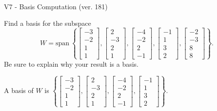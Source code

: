 \begin{exercise}
  \begin{exerciseTitle}V7 - Basis Computation (ver. 181)\end{exerciseTitle}
  \begin{exerciseStatement}
    Find a basis for the subspace 
\[W=\mathrm{span}\ \left\{\left[\begin{array}{r}
-3 \\
-2 \\
1 \\
1
\end{array}\right] , \left[\begin{array}{r}
2 \\
-3 \\
2 \\
1
\end{array}\right] , \left[\begin{array}{r}
-4 \\
-2 \\
2 \\
-1
\end{array}\right] , \left[\begin{array}{r}
-1 \\
1 \\
3 \\
2
\end{array}\right] , \left[\begin{array}{r}
-2 \\
-3 \\
8 \\
8
\end{array}\right]\right\}.\]
 Be sure to explain why your result is a basis.


  \end{exerciseStatement}
  \begin{exerciseAnswer}
   A basis of \(W\) is  \(\left\{\left[\begin{array}{r}
-3 \\
-2 \\
1 \\
1
\end{array}\right] , \left[\begin{array}{r}
2 \\
-3 \\
2 \\
1
\end{array}\right] , \left[\begin{array}{r}
-4 \\
-2 \\
2 \\
-1
\end{array}\right] , \left[\begin{array}{r}
-1 \\
1 \\
3 \\
2
\end{array}\right]\right\}\).
  


  \end{exerciseAnswer}
\end{exercise}